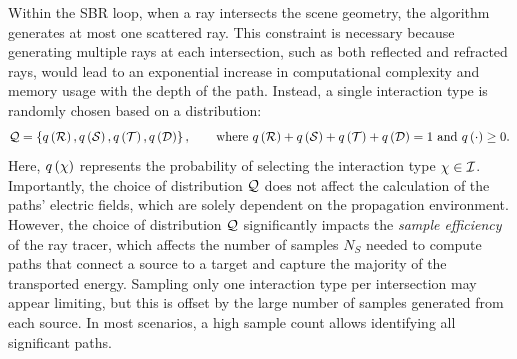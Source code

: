 Within the \gls{SBR} loop, when a ray intersects the scene geometry, the algorithm generates at most one scattered ray. This constraint is necessary because generating multiple rays at each intersection, such as both reflected and refracted rays, would lead to an exponential increase in computational complexity and memory usage with the depth of the path. Instead, a single interaction type is randomly chosen based on a distribution:
\begin{equation}
    \label{eq:path-solver-int-dist}
{\cal Q}  = \left\{ q\left({\cal R}\right), q\left({\cal S}\right), q\left({\cal T}\right), q\left({\cal D}\right) \right\},\qquad \text{where } q\left({\cal R}\right) + q\left({\cal S}\right) + q\left({\cal T}\right) + q\left({\cal D}\right) = 1 \text{ and } q\left(\cdot\right) \geq 0.
\end{equation}
Here, $q \left( \chi \right)$ represents the probability of selecting the interaction type $\chi \in {\cal I}$. Importantly, the choice of distribution ${\cal Q}$ does not affect the calculation of the paths' electric fields, which are solely dependent on the propagation environment. However, the choice of distribution ${\cal Q}$ significantly impacts the \emph{sample efficiency} of the ray tracer, which affects the number of samples $N_S$ needed to compute paths that connect a source to a target and capture the majority of the transported energy.
Sampling only one interaction type per intersection may appear limiting, but this is offset by the large number of samples generated from each source. In most scenarios, a high sample count allows identifying all significant paths.

